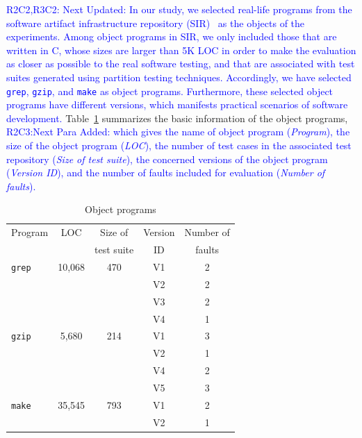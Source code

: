 \documentclass[10pt,journal,compsoc]{IEEEtran}
\begin{document}
\textcolor{blue}{R2C2,R3C2: Next Updated: In our study, we selected real-life programs from the software artifact infrastructure repository (SIR)~\cite{Do05} as the objects of the experiments. Among object programs in SIR, we only included those that are written in C, whose sizes are larger than 5K LOC in order to make the evaluation as closer as possible to the real software testing, and that are associated with test suites generated using partition testing techniques. Accordingly, we have selected \texttt{grep}, \texttt{gzip}, and \texttt{make} as object programs. Furthermore, these selected object programs have different versions, which manifests practical scenarios of software development.} Table~\ref{tab:objects} summarizes the basic information of the object programs, \textcolor{blue}{R2C3:Next Para Added: which gives the name of object program (\emph{Program}), the size of the object program (\emph{LOC}), the number of test cases in the associated test repository (\emph{Size of test suite}), the concerned versions of the object program (\emph{Version ID}), and the number of faults included for evaluation (\emph{Number of faults}).}

\begin{table}
\caption{Object programs}
\label{tab:objects}
\centering
\begin{tabular}{|l|c|c|c|c|} \hline
Program				& LOC			& Size of			& Version	& Number of	\\
        			&					& test suite	& ID			& faults		\\ \hline
\texttt{grep}	    & 10,068	        & 470					& V1			& 2					\\ \cline{4-5}
        			&					& 						& V2			& 2					\\ \cline{4-5}
        			&					& 						& V3			& 2					\\ \cline{4-5}
        			&					& 						& V4			& 1					\\ \hline
\texttt{gzip}	    & 5,680		        & 214					& V1			& 3					\\ \cline{4-5}
        			&					& 						& V2			& 1					\\ \cline{4-5}
        			&					& 						& V4			& 2					\\ \cline{4-5}
        			&					& 						& V5			& 3					\\ \hline
\texttt{make}	    & 35,545	        & 793					& V1			& 2					\\ \cline{4-5}
        			&					& 						& V2			& 1					\\ \hline
\end{tabular}
\end{table}
\end{document}
